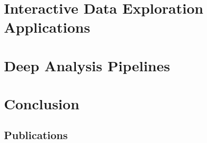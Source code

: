 \documentclass[USenglish,phd]{uit-thesis}
\begin{document}
\chapter{Interactive Data Exploration Applications}  


\chapter{Deep Analysis Pipelines}  


\chapter{Conclusion}
 

\appendix
\begin{appendix}
    \chapter{Publications}
\end{appendix}

\backmatter



\end{document}
